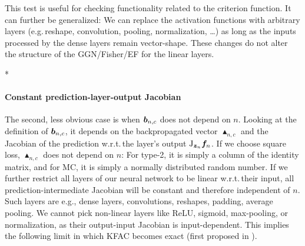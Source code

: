 This test is useful for checking functionality related to the criterion function.
It can further be generalized: We can replace the activation functions with arbitrary layers (e.g.\,reshape, convolution, pooling, normalization, \dots) as long as the inputs processed by the dense layers remain vector-shape.
These changes do not alter the structure of the GGN/Fisher/EF for the linear layers.

\switchcolumn[1]*
\switchcolumn[0]

\paragraph{Constant prediction-layer-output Jacobian} The second, less obvious case is when ${\bm{b}}_{n,c}$ does not depend on $n$.
Looking at the definition of ${\bm{b}}_{n,c}$, it depends on the backpropagated vector $\blacktriangle_{n,c}$ and the Jacobian of the prediction w.r.t.\,the layer's output $\mathrm{J}_{{\bm{z}}_n} {\bm{f}}_n$.
If we choose square loss, $\blacktriangle_{n,c}$ does not depend on $n$: For type-2, it is simply a column of the identity matrix, and for MC, it is simply a normally distributed random number.
If we further restrict all layers of our neural network to be linear w.r.t.\,their input, all prediction-intermediate Jacobian will be constant and therefore independent of $n$.
Such layers are e.g., dense layers, convolutions, reshapes, padding, average pooling.
We cannot pick non-linear layers like ReLU, sigmoid, max-pooling, or normalization, as their output-input Jacobian is input-dependent. This implies the following limit in which KFAC becomes exact (first proposed in \cite{bernacchia2018exact}).

